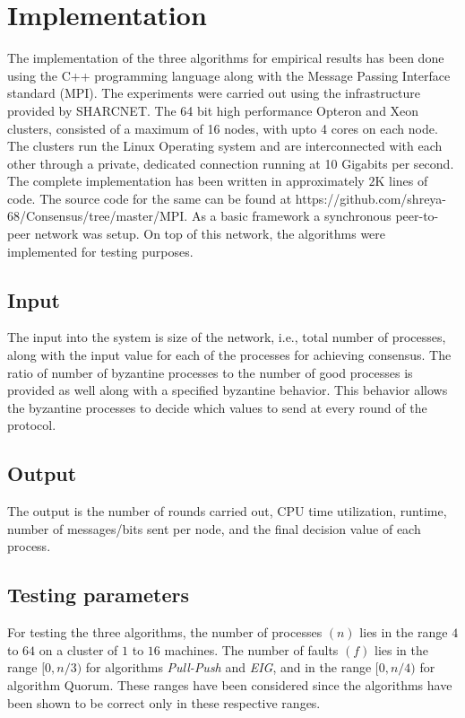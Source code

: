 ﻿\section{Implementation}
\label{sec:eval}

The implementation of the three algorithms for empirical results has been done using the C++ programming language along with the Message Passing Interface standard (MPI). The experiments were carried out using the infrastructure provided by SHARCNET. The 64 bit high performance Opteron and Xeon clusters, consisted of a maximum of 16 nodes, with upto 4 cores on each node. The clusters run the Linux Operating system and are interconnected with each other through a private, dedicated connection running at 10 Gigabits per second. The complete implementation has been written in approximately $2$K lines of code. The source code for the same can be found at https://github.com/shreya-68/Consensus/tree/master/MPI. As a basic framework a synchronous peer-to-peer network was setup. On top of this network, the algorithms were implemented for testing purposes.  

\subsection{Input}
The input into the system is size of the network, i.e., total number of processes, along with the input value for each of the processes for achieving consensus. The ratio of number of byzantine processes to the number of good processes is provided as well along with a specified byzantine behavior. This behavior allows the byzantine processes to decide which values to send at every round of the protocol. 

\subsection{Output}
The output is the number of rounds carried out, CPU time utilization, runtime, number of messages/bits sent per node, and the final decision value of each process. 

\subsection{Testing parameters}
For testing the three algorithms, the number of processes $(n)$ lies in the range $4$ to $64$ on a cluster of $1$ to $16$ machines. The number of faults $(f)$ lies in the range $[0, n/3)$ for algorithms \textit{Pull-Push} and \textit{EIG}, and in the range $[0, n/4)$ for algorithm Quorum. These ranges have been considered since the algorithms have been shown to be correct only in these respective ranges.

